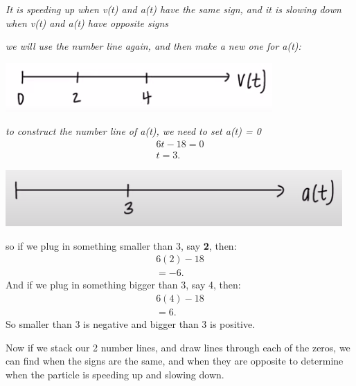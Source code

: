 \documentclass{report}
\begin{document}
   \bigbreak \noindent 
   \textit{It is speeding up when v(t) and a(t) have the same sign, and it is slowing 
     down when v(t) and a(t) have opposite signs
   }
   
   \bigbreak \noindent 
   \textit{we will use the number line again, and then make a new one for a(t):}

   \bigbreak \noindent 
   \begin{center}
     \includegraphics[scale=1]{1.png}
   \end{center}

   \bigbreak \noindent 
   \textit{to construct the number line of a(t), we need to set a(t) = 0 }
   \begin{align*}
    6t-18 = 0 \\
    t = 3
   .\end{align*}
   \bigbreak \noindent 
   \begin{center}
     \includegraphics[scale=0.8]{2.png}
   \end{center}

   \bigbreak \noindent 
   so if we plug in something smaller than 3, say \textbf{2}, then:
   \begin{align*}
     6(2) - 18 \\ 
     = -6
   .\end{align*}
   \bigbreak \noindent 
   And if we plug in something bigger than 3, say 4, then:
   \begin{align*}
     6(4) - 18 \\
     =6
   .\end{align*}
   \bigbreak \noindent 
   So smaller than 3 is negative and bigger than 3 is positive.

   \bigbreak \noindent 
   Now if we stack our 2 number lines, and draw lines through each of the zeros,
   we can find when the signs are the same, and when they are opposite to determine
   when the particle is speeding up and slowing down. 
\end{document}
